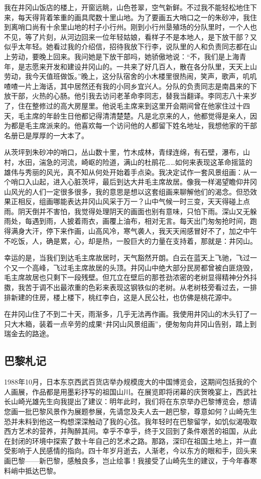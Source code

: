 \documentclass{article}
\begin{document}
我在井冈山饭店的楼上，开窗远眺，山色苍翠，空气新鲜。不过我不能轻松地住下来，每天得背着笨重的画具爬数十里山地。为了要画五大哨口之一的朱砂冲，我住到离哨口尚有十余里山地的村子小行州。刚到小行州垦殖场的分队里时，一个人也不见，等了片刻，从河边回来一位年轻姑娘，看样子不是本地人，是下放干部？又似乎太年轻。她看过我的介绍信，招待我放下行李，说队里的人和负责同志都在山上劳动，要晚上回来。我问她是下放干部吗，她骄傲地说：“不，我们是上海青年，是志愿来开发和建设井冈山的。一共来了好几百人，散在各分队里，天天上山劳动，我今天值班做饭。”晚上，这分队宿舍的小木楼里很热闹，笑声，歌声，叽叽喳喳一片上海话，其中居然还有我的小同乡宜兴人。分队的负责同志是南昌来的下放干部，火热的心肠。他引我去访问老革命李同志，替我当翻译。李同志八十来岁了，住在整修过的高大房屋里。他说毛主席来到这里开会期间曾在他家住过十四天，毛主席的年龄生日他都记得清清楚楚。凡是北京来的人，他都觉得是亲人，因为都是毛主席派来的。他喜欢每一个访问他的人都留下姓名地址，我想他家的干部名册已是厚厚的一大本了。

从茨坪到朱砂冲的哨口，丛山数十里，竹木成林，青绿连绵，有石壁，瀑布，山村，水田，湍急的河流，崎岖的险道，满山的杜鹃花……如何来表现这革命摇篮的雄伟与秀丽的风光，真不知从何处开始着手点染。我决定试作一套风景组画：从一个哨口入山起，进入心脏茨坪，最后到达大井毛主席故居。像我一样渴望瞻仰井冈山风光的人们一定很多很多，我的意思是想以这套组画来聊解他们的渴念。但恐效果正相反，组画哪能表达井冈山风采于万一？山中气候一时三变，天天得碰上点雨。阴天倒并不害怕，我觉得处理阴天的画面也别有意味，只怕下雨。深山又无躲雨处，每遇到雨，人披着雨衣，画覆上油布，相对无言。每天出门匆匆抢时间，跑得满身大汗，停下来作画，山高风冷，寒气袭人，我天天闹感冒好不了，加之中午不吃饭，人，确是累，心，却是热，一股巨大的力量在支持着，那就是：井冈山。

幸运的是，当我们到达毛主席故居时，天气豁然开朗。白云在蓝天上飞驰，飞过一个又一个高峰，飞过毛主席故居的头顶。井冈山中绝大部分民房都曾被白匪烧毁，毛主席故居也只剩下一段残壁。但兀立在壁后的那苍劲浓密的老树显得精神分外抖擞，我苦于调不出最浓重的色彩来表现这钢铁似的老树。从老树枝旁看过去，一排排新建的住房，楼上楼下，桃红李白，这是人民公社，也仿佛是桃花源中。

在井冈山住了不到二十天，雨渐多，几乎无法再作画。我使用井冈山的木头钉了一只大木箱，装着一点辛劳的成果“井冈山风景组画”，便匆匆向井冈山告别，踏上到瑞金去的路途。
\subsection{巴黎札记}
1988年10月，日本东京西武百货店举办规模庞大的中国博览会，这期间包括我的个人画展，作品都是用墨彩抒写的祖国山川。在展览即将闭幕的庆贺晚宴上，西武社长山崎光雄先生向我提出了建议：明年此时，我们将在东京举办巴黎博览会，想请您画一批巴黎风景作为展题参展，先请您及夫人去一趟巴黎，尊意如何？山崎先生恐并未料到他这一构想深深触动了我的心弦。我年轻时在巴黎留学，如饥似渴吸取西方艺术的营养，并陶醉其间。幸乎不幸乎，终于又回到了条件艰苦的祖国，从此在封闭的环境中探索了数十年自己的艺术之路。那路，深印在祖国土地上，并一直受影响于人民感情的指向。四十年岁月逝去，人渐老，今以东方的眼和手，回头来画巴黎——新巴黎，感触良多，岂止绘事！我接受了山崎先生的建议，于今年春寒料峭中抵达巴黎。
\end{document}
